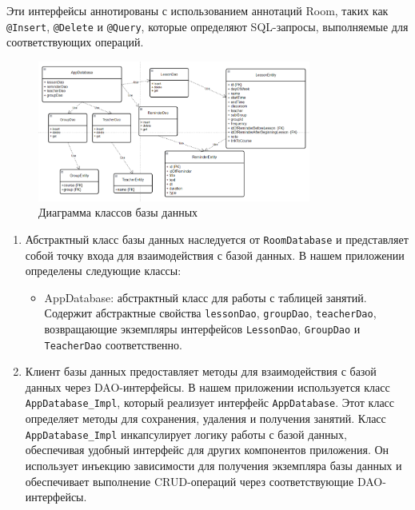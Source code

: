 \documentclass{vsureport}
\begin{document}
Эти интерфейсы аннотированы с использованием аннотаций Room, таких как \texttt{@Insert}, \texttt{@Delete} и \texttt{@Query}, которые определяют SQL-запросы, выполняемые для соответствующих операций\cite{ref10}.

\begin{figure}[H]
	\centering
	\includegraphics[width=0.8\textwidth]{9.png}
	\caption{Диаграмма классов базы данных}
	\label{fig:fig9}
\end{figure} 


\begin{enumerate}[start=3]
    \item Абстрактный класс базы данных наследуется от \texttt{RoomDatabase} и представляет собой точку входа для взаимодействия с базой данных. В нашем приложении определены следующие классы:
    
    \begin{itemize}
        \item AppDatabase: абстрактный класс для работы с таблицей занятий. Содержит абстрактные свойства \texttt{lessonDao}, \texttt{groupDao}, \texttt{teacherDao}, возвращающие экземпляры интерфейсов \texttt{LessonDao}, \texttt{GroupDao} и \texttt{TeacherDao} соответственно.
    \end{itemize}

    \item Клиент базы данных предоставляет методы для взаимодействия с базой данных через DAO-интерфейсы. В нашем приложении используется класс \texttt{AppDatabase\_Impl}, который реализует интерфейс \texttt{AppDatabase}. Этот класс определяет методы для сохранения, удаления и получения занятий. Класс \texttt{AppDatabase\_Impl} инкапсулирует логику работы с базой данных, обеспечивая удобный интерфейс для других компонентов приложения. Он использует инъекцию зависимости для получения экземпляра базы данных и обеспечивает выполнение CRUD-операций через соответствующие DAO-интерфейсы.
\end{enumerate}
\end{document}
